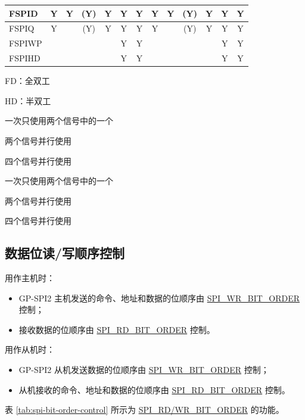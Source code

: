 \documentclass[main\_\_CN.tex]{subfiles}
\begin{document}
\begin{landscape}
\begin{table}[H]
\begin{threeparttable}
\begin{tabular}{ |p{2.0cm} |c|c|c|c|c|c|c|c|c|c|c|c| }
FSPID                    & Y       & Y       & (Y)\tnote{3}      & Y\tnote{4}      & Y\tnote{5}      & Y      & Y       & Y      & (Y)\tnote{6}      & Y\tnote{7}     & Y\tnote{8}     & Y      \\ \hline
FSPIQ                    & Y       &         & (Y)\tnote{3}      & Y\tnote{4}      & Y\tnote{5}      & Y      & Y       &        & (Y)\tnote{6}     & Y\tnote{7}     & Y\tnote{8}      & Y      \\ \hline
FSPIWP                   &         &         &         &         & Y\tnote{5}      & Y      &         &        &         &         & Y\tnote{8}       & Y      \\ \hline
FSPIHD                   &         &         &         &         & Y\tnote{5}      & Y      &         &        &         &         & Y\tnote{8}       & Y      \\ \hline
\end{tabular}

        \begin{tablenotes}
            \item[1] FD：全双工
            \item[2] HD：半双工
            \item[3] 一次只使用两个信号中的一个
            \item[4] 两个信号并行使用
            \item[5] 四个信号并行使用
            \item[6] 一次只使用两个信号中的一个
            \item[7] 两个信号并行使用
            \item[8] 四个信号并行使用
        \end{tablenotes}
     \end{threeparttable}
    \end{table}
\end{landscape}

\subsection{数据位读/写顺序控制}
用作主机时：
\begin{itemize}
    \item GP-SPI2 主机发送的命令、地址和数据的位顺序由 \hyperref[fielddesc:SPIWRBITORDER]{SPI\_WR\_BIT\_ORDER} 控制；
    \item 接收数据的位顺序由 \hyperref[fielddesc:SPIRDBITORDER]{SPI\_RD\_BIT\_ORDER} 控制。
\end{itemize}
用作从机时：
\begin{itemize}
    \item GP-SPI2 从机发送数据的位顺序由 \hyperref[fielddesc:SPIWRBITORDER]{SPI\_WR\_BIT\_ORDER} 控制；
    \item 从机接收的命令、地址和数据的位顺序由 \hyperref[fielddesc:SPIRDBITORDER]{SPI\_RD\_BIT\_ORDER} 控制。
\end{itemize}
表 \ref{tab:spi-bit-order-control} 所示为 \hyperref[fielddesc:SPIRDBITORDER]{SPI\_RD/WR\_BIT\_ORDER} 的功能。
\end{document}
